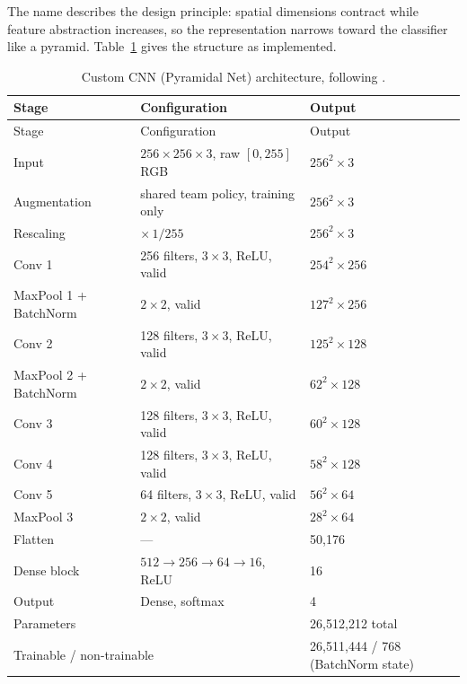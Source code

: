 \documentclass[11pt,twoside,a4paper]{article}
\begin{document}
The name describes the design principle: spatial dimensions contract while
feature abstraction increases, so the representation narrows toward the
classifier like a pyramid. Table~\ref{tab:customcnn-arch} gives the structure as
implemented.

\small
\begin{longtable}{lll}
\caption{Custom CNN (Pyramidal Net) architecture, following \cite{Abdelmonem2026}.}
\label{tab:customcnn-arch}\\

\toprule
Stage & Configuration & Output \\
\midrule
\endfirsthead

\toprule
Stage & Configuration & Output \\
\midrule
\endhead

\endfoot

\bottomrule
\endlastfoot

Input & $256 \times 256 \times 3$, raw $[0,255]$ RGB & $256^2 \times 3$ \\
Augmentation & shared team policy, training only & $256^2 \times 3$ \\
Rescaling & $\times \, 1/255$ & $256^2 \times 3$ \\
Conv 1 & 256 filters, $3\times3$, ReLU, valid & $254^2 \times 256$ \\
MaxPool 1 + BatchNorm & $2\times2$, valid & $127^2 \times 256$ \\
Conv 2 & 128 filters, $3\times3$, ReLU, valid & $125^2 \times 128$ \\
MaxPool 2 + BatchNorm & $2\times2$, valid & $62^2 \times 128$ \\
Conv 3 & 128 filters, $3\times3$, ReLU, valid & $60^2 \times 128$ \\
Conv 4 & 128 filters, $3\times3$, ReLU, valid & $58^2 \times 128$ \\
Conv 5 & 64 filters, $3\times3$, ReLU, valid & $56^2 \times 64$ \\
MaxPool 3 & $2\times2$, valid & $28^2 \times 64$ \\
Flatten & --- & 50{,}176 \\
Dense block & $512 \rightarrow 256 \rightarrow 64 \rightarrow 16$, ReLU & 16 \\
Output & Dense, softmax & 4 \\

\midrule
\multicolumn{2}{l}{Parameters} & 26{,}512{,}212 total \\
\multicolumn{2}{l}{Trainable / non-trainable} &
26{,}511{,}444 / 768 (BatchNorm state) \\

\end{longtable}
\normalsize
\end{document}
